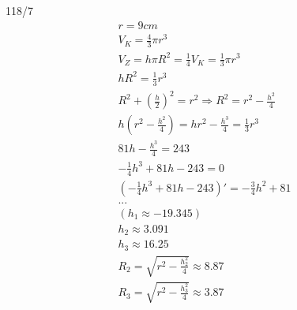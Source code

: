 \begin{exercise}{118/7}
  \begin{gather*}
    r = 9cm \\
    V_K = \frac{4}{3}\pi r^3 \\
    V_Z = h\pi R^2 = \frac{1}{4}V_K = \frac{1}{3}\pi r^3 \\
    hR^2 = \frac{1}{3}r^3 \\
    R^2 + (\frac{h}{2})^2 = r^2 \Rightarrow R^2 = r^2 - \frac{h^2}{4} \\
    h(r^2 - \frac{h^2}{4}) = hr^2 - \frac{h^3}{4} = \frac{1}{3}r^3 \\
    81h - \frac{h^3}{4} = 243 \\
    -\frac{1}{4}h^3 + 81h - 243 = 0 \\
    (-\frac{1}{4}h^3 + 81h - 243)' = -\frac{3}{4}h^2 + 81 \\
    ... \\
    (h_1 \approx -19.345) \\
    h_2 \approx 3.091 \\
    h_3 \approx 16.25 \\
    R_2 = \sqrt{r^2 - \frac{h_2^2}{4}} \approx 8.87 \\
    R_3 = \sqrt{r^2 - \frac{h_3^2}{4}} \approx 3.87
  \end{gather*}
\end{exercise}
\newpage
